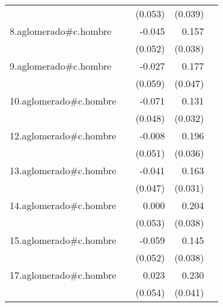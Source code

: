 {\begin{longtable}{l*{4}{D{.}{.}{-1}}}
            &                     &     (0.053)         &     (0.039)         &                     \\
\addlinespace
8.aglomerado#c.hombre&                     &      -0.045         &       0.157\sym{***}&                     \\
            &                     &     (0.052)         &     (0.038)         &                     \\
\addlinespace
9.aglomerado#c.hombre&                     &      -0.027         &       0.177\sym{***}&                     \\
            &                     &     (0.059)         &     (0.047)         &                     \\
\addlinespace
10.aglomerado#c.hombre&                     &      -0.071         &       0.131\sym{***}&                     \\
            &                     &     (0.048)         &     (0.032)         &                     \\
\addlinespace
12.aglomerado#c.hombre&                     &      -0.008         &       0.196\sym{***}&                     \\
            &                     &     (0.051)         &     (0.036)         &                     \\
\addlinespace
13.aglomerado#c.hombre&                     &      -0.041         &       0.163\sym{***}&                     \\
            &                     &     (0.047)         &     (0.031)         &                     \\
\addlinespace
14.aglomerado#c.hombre&                     &       0.000         &       0.204\sym{***}&                     \\
            &                     &     (0.053)         &     (0.038)         &                     \\
\addlinespace
15.aglomerado#c.hombre&                     &      -0.059         &       0.145\sym{***}&                     \\
            &                     &     (0.052)         &     (0.038)         &                     \\
\addlinespace
17.aglomerado#c.hombre&                     &       0.023         &       0.230\sym{***}&                     \\
            &                     &     (0.054)         &     (0.041)         &                     \\

\end{longtable}}
